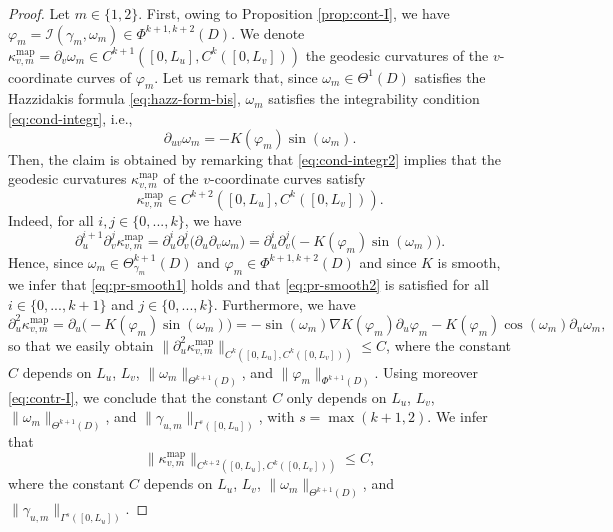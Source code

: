 \documentclass{article}
\newcommand{\I}{\mathcal{I}}
\newcommand{\DUV}{\partial_{uv}}
\newcommand{\kop}{\kappa^{\mathrm{map}}}
\newcommand{\DU}{\partial_{u}}
\newcommand{\DV}{\partial_{v}}
\theoremstyle{remark}
\theoremstyle{prpart}
\begin{document}
\begin{proof}
  Let $m\in\{1,2\}$. First, owing to Proposition \ref{prop:cont-I}, we have $\varphi_m = \I(\gamma_{m},\omega_m)\in \Phi^{k+1,k+2}(D)$. We denote $\kop_{v,m}=\partial_v\omega_m\in C^{k+1}([0,L_u],C^{k}([0,L_v]))$ the geodesic curvatures of the $v$-coordinate curves of $\varphi_m$.
  Let us remark that, since $\omega_m\in\Theta^{1}(D)$ satisfies the Hazzidakis formula \eqref{eq:hazz-form-bis}, $\omega_m$ satisfies the integrability condition  \eqref{eq:cond-integr}, i.e.,
\begin{equation}\label{eq:cond-integr2}
  \DUV \omega_m = -K(\varphi_m) \sin(\omega_m).
\end{equation}
Then, the claim is obtained by remarking that \eqref{eq:cond-integr2} implies that the geodesic curvatures $\kop_{v,m}$ of the $v$-coordinate curves satisfy
\begin{equation}\label{eq:pr-smooth1}
  \kop_{v,m}\in C^{k+2}([0,L_u],C^{k}([0,L_v])).
\end{equation}
Indeed, for all $i,j\in\{0,...,k\}$, we have
\begin{equation}\label{eq:pr-smooth2}
\partial_u^{i+1}\partial_v^j\kop_{v,m} = \partial_u^{i}\partial_v^{j}\big(\DU\DV\omega_m\big) = \partial_u^{i}\partial_v^{j}\Big({-}K(\varphi_m) \sin(\omega_m)\Big).
\end{equation}
Hence, since $\omega_m\in \Theta_{\gamma_m}^{k+1}(D)$ and $\varphi_m\in \Phi^{k+1,k+2}(D)$ and since $K$ is smooth, we infer that \eqref{eq:pr-smooth1} holds and that \eqref{eq:pr-smooth2} is satisfied for all $i\in\{0,...,k{+}1\}$ and $j\in\{0,...,k\}$. Furthermore, we have
\begin{equation}\label{eq:pr-smooth3}
    \DU^2\kop_{v,m}=\DU\big({-}K(\varphi_m) \sin(\omega_m)\big)= -\sin(\omega_m)\nabla K(\varphi_m)\partial_u\varphi_m-K(\varphi_m)\cos(\omega_m)\partial_u\omega_m,
\end{equation}
so that we easily obtain $\big\|\DU^2\kop_{v,m}\big\|_{C^{k}([0,L_u],C^k([0,L_v]))}\leq C$, where the constant $C$ depends on $L_u$, $L_v$, $\|\omega_m\|_{\Theta^{k+1}(D)}$, and $\|\varphi_m\|_{\Phi^{k+1}(D)}$. Using moreover \eqref{eq:contr-I}, we conclude that the constant $C$ only depends on $L_u$, $L_v$,  $\|\omega_m\|_{\Theta^{k+1}(D)}$, and $\|\gamma_{u,m}\|_{\Gamma^{s}([0,L_u])}$, with $s=\max(k+1,2)$. We infer that
\begin{equation}\label{eq:pr-smooth4}
    \big\|\kop_{v,m}\big\|_{C^{k+2}([0,L_u],C^{k}([0,L_v]))}\leq C,
  \end{equation}where the constant $C$ depends on $L_u$, $L_v$, $\|\omega_m\|_{\Theta^{k+1}(D)}$, and $\|\gamma_{u,m}\|_{\Gamma^{s}([0,L_u])}$.

\end{proof}
\end{document}

